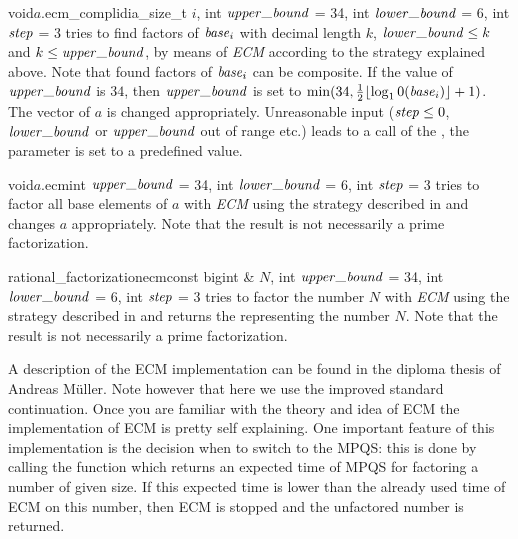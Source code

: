 \begin{fcode}{void}{$a$.ecm_comp}{lidia_size_t $i$, int $\upperbound$ = 34, int $\lowerbound$ = 6,
    int $\mathit{step}$ = 3}%
  tries to find factors of $\mathit{base}_i$ with decimal length $k$, $\lowerbound \leq k$ and $k \leq
  \upperbound$, by means of \emph{ECM} according to the strategy explained above.  Note that
  found factors of $\mathit{base}_i$ can be composite.  If the value of $\upperbound$ is $34$, then
  $\upperbound$ is set to $\min(34, \frac{1}{2} \lfloor \log_10 (\mathit{base}_i)\rfloor + 1)$.  The
  vector of $a$ is changed appropriately.  Unreasonable input ($\mathit{step} \leq 0$, $\lowerbound$ or
  $\upperbound$ out of range etc.) leads to a call of the , the
  parameter is set to a predefined value.
\end{fcode}

\begin{fcode}{void}{$a$.ecm}{int $\upperbound$ = 34, int $\lowerbound$ = 6, int $\mathit{step}$ = 3}
  tries to factor all base elements of $a$ with \emph{ECM} using the strategy described in
   and changes $a$ appropriately.  Note that the result is not
  necessarily a prime factorization.
\end{fcode}

\begin{fcode}{rational_factorization}{ecm}{const bigint & $N$, int $\upperbound$ = 34,
    int $\lowerbound$ = 6, int $\mathit{step}$ = 3}%
  tries to factor the number $N$ with \emph{ECM} using the strategy described in
   and returns the  representing the number
  $N$.  Note that the result is not necessarily a prime factorization.
\end{fcode}

\begin{techdoc}
  A description of the ECM implementation can be found in the diploma thesis of Andreas
  M{\"u}ller.  Note however that here we use the improved standard continuation.  Once you are
  familiar with the theory and idea of ECM the \LiDIA implementation of ECM is pretty self
  explaining.  One important feature of this implementation is the decision when to switch to
  the MPQS: this is done by calling the function  which returns an expected time of
  MPQS for factoring a number of given size.  If this expected time is lower than the already
  used time of ECM on this number, then ECM is stopped and the unfactored number is returned.
\end{techdoc}

